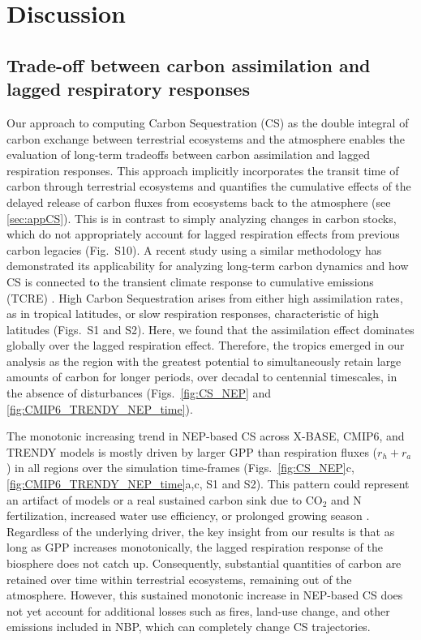 \documentclass[ProofPDF]{./Styles/Jnls-Template-V3}
\begin{document}
\section{Discussion}
\subsection{Trade-off between carbon assimilation and lagged respiratory responses}
Our approach to computing Carbon Sequestration (CS) as the double integral of carbon exchange between terrestrial ecosystems and the atmosphere enables the evaluation of long-term tradeoffs between carbon assimilation and lagged respiration responses. This approach implicitly incorporates the transit time of carbon through terrestrial ecosystems and quantifies the cumulative effects of the delayed release of carbon fluxes from ecosystems back to the atmosphere (see \ref{sec:appCS}). This is in contrast to simply analyzing changes in carbon stocks, which do not appropriately account for lagged respiration effects from previous carbon legacies (Fig.~S10). A recent study using a similar methodology has demonstrated its applicability for analyzing long-term carbon dynamics and how CS is connected to the transient climate response to cumulative emissions (TCRE) \citep{Matthews2023}. High Carbon Sequestration arises from either high assimilation rates, as in tropical latitudes, or slow respiration responses, characteristic of high latitudes (Figs.~S1 and S2). Here, we found that the assimilation effect dominates globally over the lagged respiration effect. Therefore, the tropics emerged in our analysis as the region with the greatest potential to simultaneously retain large amounts of carbon for longer periods, over decadal to centennial timescales, in the absence of disturbances (Figs.~\ref{fig:CS_NEP} and \ref{fig:CMIP6_TRENDY_NEP_time}). 

The monotonic increasing trend in NEP-based CS across X-BASE, CMIP6, and TRENDY models is mostly driven by larger GPP than respiration fluxes ($r_h+r_a$) in all regions over the simulation time-frames (Figs.~\ref{fig:CS_NEP}c, \ref{fig:CMIP6_TRENDY_NEP_time}a,c, S1 and S2). This pattern could represent an artifact of models or a real sustained carbon sink due to CO$_2$ and N fertilization, increased water use efficiency, or prolonged growing season \citep{Fernandez-Martinez2017,Fernandez-Martinez2019,OSullivan2019,Friedlingstein2023,Ruehr2023}. Regardless of the underlying driver, the key insight from our results is that as long as GPP increases monotonically, the lagged respiration response of the biosphere does not catch up. Consequently, substantial quantities of carbon are retained over time within terrestrial ecosystems, remaining out of the atmosphere. However, this sustained monotonic increase in NEP-based CS does not yet account for additional losses such as fires, land-use change, and other emissions included in NBP, which can completely change CS trajectories.
\end{document}
